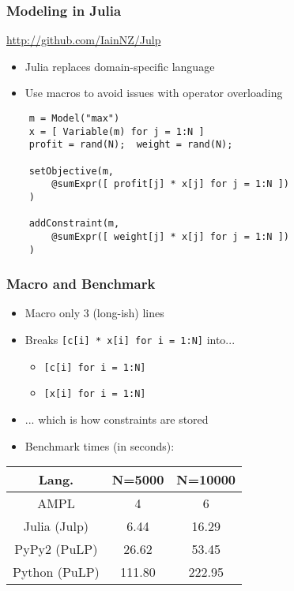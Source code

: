 \documentclass{beamer}
\begin{document}
\begin{frame}[fragile]
	\frametitle{Modeling in Julia}
	\begin{center}
		\url{http://github.com/IainNZ/Julp}
	\end{center}
	\begin{itemize}
		\item Julia replaces domain-specific language
		\item Use macros to avoid issues with operator overloading
	\end{itemize}
	{\small
	\begin{verbatim}
    m = Model("max")
    x = [ Variable(m) for j = 1:N ]
    profit = rand(N);  weight = rand(N);
    
    setObjective(m, 
        @sumExpr([ profit[j] * x[j] for j = 1:N ])
    )
    
    addConstraint(m,
        @sumExpr([ weight[j] * x[j] for j = 1:N ])
    )
	\end{verbatim}
	}
\end{frame}

\begin{frame}[fragile]
	\frametitle{Macro and Benchmark}
	\begin{itemize}
		\item Macro only 3 (long-ish) lines
		\item Breaks \texttt{[c[i] * x[i] for i = 1:N]} into...
		\begin{itemize}
			\item \texttt{[c[i] for i = 1:N]}
			\item \texttt{[x[i] for i = 1:N]}
		\end{itemize}
		\item ... which is how constraints are stored
		\item Benchmark times (in seconds):
	\end{itemize}
	\begin{table}
		\begin{tabular}{|c|c|c|}
			\hline
			Lang. & N=5000 & N=10000 \\
			\hline
			AMPL & 4 & 6 \\
			Julia (Julp) & 6.44 & 16.29 \\
			PyPy2 (PuLP) & 26.62 & 53.45 \\
			Python (PuLP) & 111.80 & 222.95 \\
			\hline
		\end{tabular}
	\end{table}
\end{frame}
\end{document}
